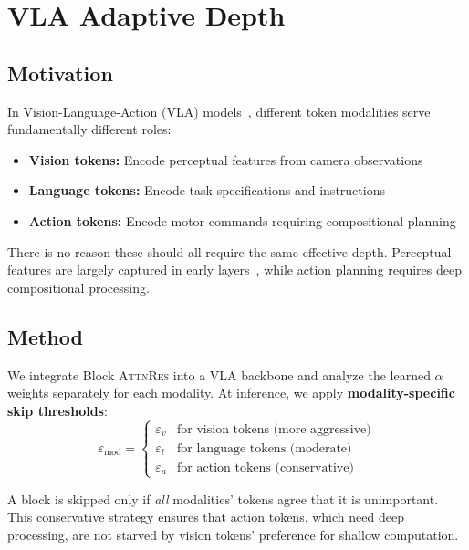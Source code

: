 \documentclass{article}
\newcommand{\attnres}{\textsc{AttnRes}}
\begin{document}
\section{VLA Adaptive Depth}
\label{sec:vla}

\subsection{Motivation}

In Vision-Language-Action (VLA) models~\citep{brohan2023rt, team2024octo, kim2024openvla}, different token modalities serve fundamentally different roles:
\begin{itemize}
    \item \textbf{Vision tokens:} Encode perceptual features from camera observations
    \item \textbf{Language tokens:} Encode task specifications and instructions
    \item \textbf{Action tokens:} Encode motor commands requiring compositional planning
\end{itemize}

There is no reason these should all require the same effective depth. Perceptual features are largely captured in early layers~\citep{raghu2021vision}, while action planning requires deep compositional processing.

\subsection{Method}

We integrate Block \attnres{} into a VLA backbone and analyze the learned $\alpha$ weights separately for each modality. At inference, we apply \textbf{modality-specific skip thresholds}:
\begin{equation}
    \varepsilon_{\text{mod}} = \begin{cases}
        \varepsilon_v & \text{for vision tokens (more aggressive)} \\
        \varepsilon_l & \text{for language tokens (moderate)} \\
        \varepsilon_a & \text{for action tokens (conservative)}
    \end{cases}
\end{equation}

A block is skipped only if \emph{all} modalities' tokens agree that it is unimportant. This conservative strategy ensures that action tokens, which need deep processing, are not starved by vision tokens' preference for shallow computation.
\end{document}

